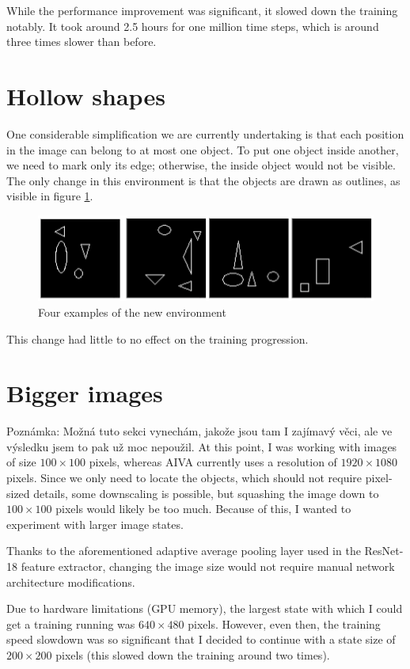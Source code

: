 \documentclass[
  digital,     %
  oneside,     %
  nosansbold,  %
  nocolorbold, %
  lof,         %
  lot,         %
]{fithesis4}
\begin{document}
While the performance improvement was significant, it slowed down the training notably. It took around 2.5 hours for one million time steps, which is around three times slower than before.

\section{Hollow shapes}
One considerable simplification we are currently undertaking is that each position in the image can belong to at most one object. To put one object inside another, we need to mark only its edge; otherwise, the inside object would not be visible. The only change in this environment is that the objects are drawn as outlines, as visible in figure \ref{fig:env5}.

\begin{figure}
    \centering
    \includegraphics[width=1\linewidth]{env_examples/env5.png}
    \caption{Four examples of the new environment}
    \label{fig:env5}
\end{figure}
 
This change had little to no effect on the training progression.

\section{Bigger images}
Poznámka: Možná tuto sekci vynechám, jakože jsou tam I zajímavý věci, ale ve výsledku jsem to pak už moc nepoužil.
At this point, I was working with images of size $100\times100$ pixels, whereas AIVA currently uses a resolution of $1920\times1080$ pixels. Since we only need to locate the objects, which should not require pixel-sized details, some downscaling is possible, but squashing the image down to $100\times100$ pixels would likely be too much. Because of this, I wanted to experiment with larger image states.

Thanks to the aforementioned adaptive average pooling layer used in the ResNet-18 feature extractor, changing the image size would not require manual network architecture modifications.

Due to hardware limitations (GPU memory), the largest state with which I could get a training running was $640\times480$ pixels. However, even then, the training speed slowdown was so significant that I decided to continue with a state size of $200\times200$ pixels (this slowed down the training around two times).
\end{document}
